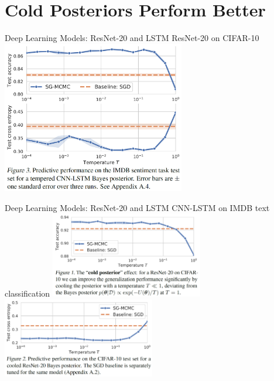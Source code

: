 \documentclass[mathserif,dvipsnames,table,xcdraw]{beamer}
\begin{document}
\section[Cold Posteriors Perform Better]{Cold Posteriors Perform Better}
\label{sec:cold_posteriors_better}

	\begin{frame}{Deep Learning Models: ResNet-20 and LSTM}
		{ResNet-20 on CIFAR-10}
		\centering
		\includegraphics[width=0.6\textwidth]{../figures/imdb_12.png}
	\end{frame}

	\begin{frame}{Deep Learning Models: ResNet-20 and LSTM}
		{CNN-LSTM on IMDB text classification}
		\centering
		\includegraphics[width=0.5\textwidth]{../figures/cold_post_1.png}\hfill
		\includegraphics[width=0.5\textwidth]{../figures/cold_post_2.png}
	\end{frame}
\end{document}
